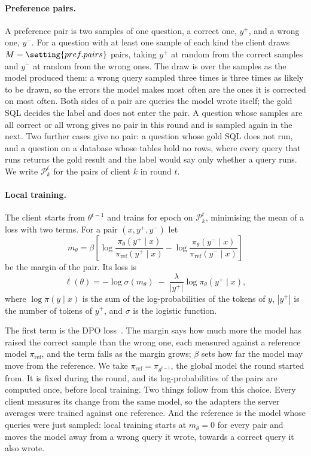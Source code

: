 \paragraph{Preference pairs.}
A preference pair is two samples of one question, a correct one, $y^{+}$, and a wrong one, $y^{-}$. For a question with at least one sample of each kind the client draws $M = \setting{pref.pairs}$ pairs, taking $y^{+}$ at random from the correct samples and $y^{-}$ at random from the wrong ones. The draw is over the samples as the model produced them: a wrong query sampled three times is three times as likely to be drawn, so the errors the model makes most often are the ones it is corrected on most often. Both sides of a pair are queries the model wrote itself; the gold SQL decides the label and does not enter the pair. A question whose samples are all correct or all wrong gives no pair in this round and is sampled again in the next. Two further cases give no pair: a question whose gold SQL does not run, and a question on a database whose tables hold no rows, where every query that runs returns the gold result and the label would say only whether a query runs. We write $\mathcal{P}_k^{t}$ for the pairs of client $k$ in round $t$.

\paragraph{Local training.}
The client starts from $\theta^{t-1}$ and trains for  epoch on $\mathcal{P}_k^{t}$, minimising the mean of a loss with two terms. For a pair $(x, y^{+}, y^{-})$ let
\begin{equation}
  m_\theta = \beta \left[ \log \frac{\pi_\theta(y^{+} \mid x)}{\pi_{\mathrm{ref}}(y^{+} \mid x)} - \log \frac{\pi_\theta(y^{-} \mid x)}{\pi_{\mathrm{ref}}(y^{-} \mid x)} \right]
  \label{eq:margin}
\end{equation}
be the margin of the pair. Its loss is
\begin{equation}
  \ell(\theta) = -\log \sigma(m_\theta) \; - \; \frac{\lambda}{|y^{+}|} \log \pi_\theta(y^{+} \mid x),
  \label{eq:loss}
\end{equation}
where $\log \pi(y \mid x)$ is the sum of the log-probabilities of the tokens of $y$, $|y^{+}|$ is the number of tokens of $y^{+}$, and $\sigma$ is the logistic function.

The first term is the DPO loss~\cite{rafailov2023dpo}. The margin says how much more the model has raised the correct sample than the wrong one, each measured against a reference model $\pi_{\mathrm{ref}}$, and the term falls as the margin grows; $\beta$ sets how far the model may move from the reference. We take $\pi_{\mathrm{ref}} = \pi_{\theta^{t-1}}$, the global model the round started from. It is fixed during the round, and its log-probabilities of the pairs are computed once, before local training. Two things follow from this choice. Every client measures its change from the same model, so the adapters the server averages were trained against one reference. And the reference is the model whose queries were just sampled: local training starts at $m_\theta = 0$ for every pair and moves the model away from a wrong query it wrote, towards a correct query it also wrote.

